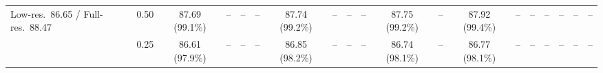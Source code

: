 \begin{table}[t]
{\begin{tabular}{l c | c c c c | c c c c | c c | c c c | c c c c}
{\footnotesize Low-res.\ 86.65 / Full-res.\ 88.47} & 0.50 & \cellcolor{gray!15}87.69 (99.1\%) & -- & -- & -- & \cellcolor{gray!15}87.74 (99.2\%) & -- & -- & -- & \cellcolor{gray!15}87.75 (99.2\%) & -- & \cellcolor{gray!15}87.92 (99.4\%) & -- & -- & -- & -- & -- & -- \\
 & 0.25 & 86.61 (97.9\%) & -- & -- & -- & \cellcolor{gray!15}86.85 (98.2\%) & -- & -- & -- & \cellcolor{gray!15}86.74 (98.1\%) & -- & \cellcolor{gray!15}86.77 (98.1\%) & -- & -- & -- & -- & -- & -- \\
\bottomrule
\end{tabular}}
\end{table}
